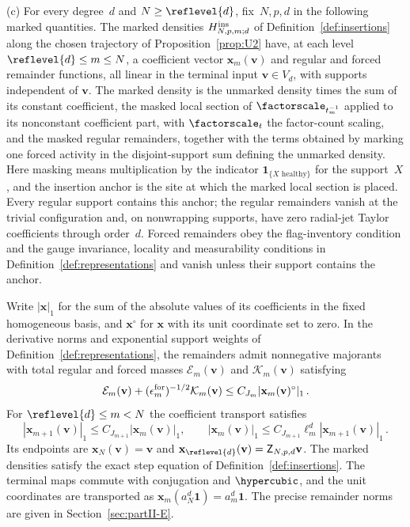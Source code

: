 \begin{proposition}
(c) For every degree~$d$ and $N\ge\reflevel{d}$, fix~$N,p,d$ in the following marked quantities. The marked densities $H^{\rm ins}_{N,p,m;d}$ of Definition~\ref{def:insertions} along the chosen trajectory of Proposition~\ref{prop:U2} have, at each level $\reflevel{d}\le m\le N$, a coefficient vector $\mathbf x_m(\mathbf v)$ and regular and forced remainder functions, all linear in the terminal input $\mathbf v\in V_d$, with supports independent of $\mathbf v$. The marked density is the unmarked density times the sum of its constant coefficient, the masked local section of $\factorscale_{t_m^{-1}}$ applied to its nonconstant coefficient part, with $\factorscale_t$ the factor-count scaling, and the masked regular remainders, together with the terms obtained by marking one forced activity in the disjoint-support sum defining the unmarked density. Here masking means multiplication by the indicator $\mathbf1_{\{X\text{ healthy}\}}$ for the support~$X$, and the insertion anchor is the site at which the marked local section is placed. Every regular support contains this anchor; the regular remainders vanish at the trivial configuration and, on nonwrapping supports, have zero radial-jet Taylor coefficients through order~$d$. Forced remainders obey the flag-inventory condition and the gauge invariance, locality and measurability conditions in Definition~\ref{def:representations} and vanish unless their support contains the anchor.

Write $|\mathbf x|_1$ for the sum of the absolute values of its coefficients in the fixed homogeneous basis, and $\mathbf x^\circ$ for $\mathbf x$ with its unit coordinate set to zero. In the derivative norms and exponential support weights of Definition~\ref{def:representations}, the remainders admit nonnegative majorants with total regular and forced masses $\mathcal E_m(\mathbf v)$ and $\mathcal K_m(\mathbf v)$ satisfying
\begin{equation}\label{eq:U1-2}
\mathcal E_m(\mathbf v)+(\epsilon_m^{\rm for})^{-1/2}\mathcal K_m(\mathbf v)\le C_{J_m}|\mathbf x_m(\mathbf v)^\circ|_1\,.
\end{equation}
For $\reflevel{d}\le m<N$ the coefficient transport satisfies
\begin{equation}\label{eq:U1-3}
|\mathbf x_{m+1}(\mathbf v)|_1\le C_{J_{m+1}}|\mathbf x_m(\mathbf v)|_1,\qquad
|\mathbf x_m(\mathbf v)|_1\le C_{J_{m+1}}\ell_m^d|\mathbf x_{m+1}(\mathbf v)|_1\,.
\end{equation}
Its endpoints are $\mathbf x_N(\mathbf v)=\mathbf v$ and $\mathbf x_{\reflevel{d}}(\mathbf v)=\mathsf Z_{N,p,d}\mathbf v$. The marked densities satisfy the exact step equation of Definition~\ref{def:insertions}. The terminal maps commute with conjugation and $\hypercubic$, and the unit coordinates are transported as $\mathbf x_m(a_N^d\mathbf1)=a_m^d\mathbf1$. The precise remainder norms are given in Section~\ref{sec:partII-E}.
\end{proposition}

